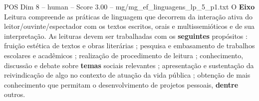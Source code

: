 \begin{textsample}{POS Dim 8 – human – Score 3.00 – mg/mg\_ef\_linguagens\_lp\_5\_p1.txt}  \label{ex:f8_pos_003}
O \textbf{Eixo} Leitura compreende as práticas de linguagem que decorrem da interação ativa do leitor/ouvinte/espectador com os textos escritos, orais e multissemióticos e de sua interpretação.
As leituras devem ser trabalhadas com os \textbf{seguintes} propósitos : fruição estética de textos e obras literárias ; pesquisa e embasamento de trabalhos escolares e acadêmicos ; realização de procedimento de leitura ; conhecimento, discussão e debate sobre \textbf{temas} sociais relevantes ; apresentação e sustentação da reivindicação de algo no contexto de atuação da vida pública ; obtenção de mais conhecimento que permitam o desenvolvimento de projetos pessoais, \textbf{dentre} outros.

\end{textsample}
